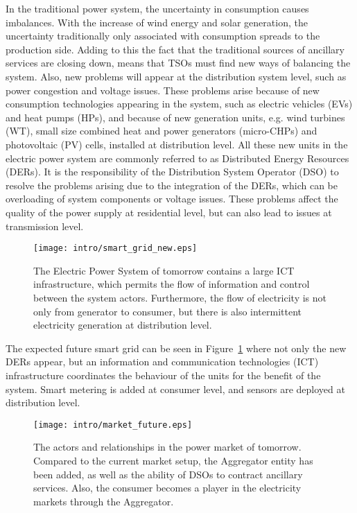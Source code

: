 In the traditional power system, the uncertainty in consumption causes imbalances. With the increase of wind energy and solar generation, the uncertainty traditionally only associated with consumption spreads to the production side. Adding to this the fact that the traditional sources of ancillary services are closing down, means that TSOs must find new ways of balancing the system. Also, new problems will appear at the distribution system level, such as power congestion and voltage issues. These problems arise because of new consumption technologies appearing in the system, such as electric vehicles (EVs) and heat pumps (HPs), and because of new generation units, e.g. wind turbines (WT), small size combined heat and power generators (micro-CHPs) and photovoltaic (PV) cells, installed at distribution level. All these new units in the electric power system are commonly referred to as Distributed Energy Resources (DERs). It is the responsibility of the Distribution System Operator (DSO) to resolve the problems arising due to the integration of the DERs, which can be overloading of system components or voltage issues. These problems affect the quality of the power supply at residential level, but can also lead to issues at transmission level.
\begin{figure}[ht]
	\centering
	\caption{The Electric Power System of tomorrow contains a large ICT infrastructure, which permits the flow of information and control between the system actors. Furthermore, the flow of electricity is not only from generator to consumer, but there is also intermittent electricity generation at distribution level.}
	\texttt{[image: intro/smart\_grid\_new.eps]}\label{fig:powerfuture}
\end{figure}

The expected future smart grid can be seen in Figure~\ref{fig:powerfuture} where not only the new DERs appear, but an information and communication technologies (ICT) infrastructure coordinates the behaviour of the units for the benefit of the system. Smart metering is added at consumer level, and sensors are deployed at distribution level.
\begin{figure*}[htbp!]
	\centering
	\caption{The actors and relationships in the power market of tomorrow. Compared to the current market setup, the Aggregator entity has been added, as well as the ability of DSOs to contract ancillary services. Also, the consumer becomes a player in the electricity markets through the Aggregator.}
	\texttt{[image: intro/market\_future.eps]}\label{fig:marketfuture}
\end{figure*}

